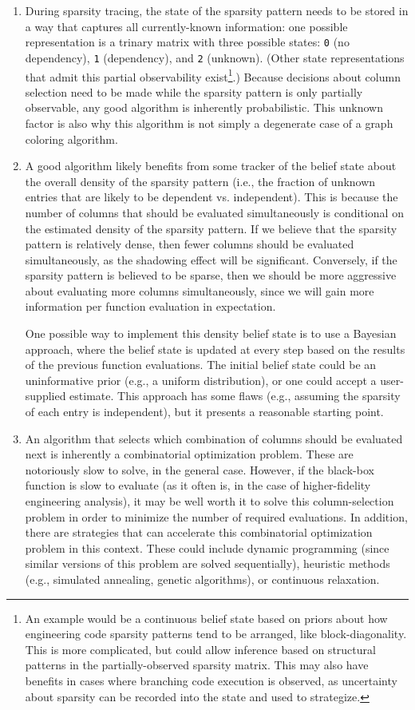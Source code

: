\documentclass{article}
\begin{document}
\begin{enumerate}
    \item During sparsity tracing, the state of the sparsity pattern needs to be stored in a way that captures all currently-known information: one possible representation is a trinary matrix with three possible states: \texttt{0} (no dependency), \texttt{1} (dependency), and \texttt{2} (unknown). (Other state representations that admit this partial observability exist\footnote{An example would be a continuous belief state based on priors about how engineering code sparsity patterns tend to be arranged, like block-diagonality. This is more complicated, but could allow inference based on structural patterns in the partially-observed sparsity matrix. This may also have benefits in cases where branching code execution is observed, as uncertainty about sparsity can be recorded into the state and used to strategize.}.) Because decisions about column selection need to be made while the sparsity pattern is only partially observable, any good algorithm is inherently probabilistic. This unknown factor is also why this algorithm is not simply a degenerate case of a graph coloring algorithm.
    \item A good algorithm likely benefits from some tracker of the belief state about the overall density of the sparsity pattern (i.e., the fraction of unknown entries that are likely to be dependent vs. independent). This is because the number of columns that should be evaluated simultaneously is conditional on the estimated density of the sparsity pattern. If we believe that the sparsity pattern is relatively dense, then fewer columns should be evaluated simultaneously, as the shadowing effect will be significant. Conversely, if the sparsity pattern is believed to be sparse, then we should be more aggressive about evaluating more columns simultaneously, since we will gain more information per function evaluation in expectation.

          One possible way to implement this density belief state is to use a Bayesian approach, where the belief state is updated at every step based on the results of the previous function evaluations. The initial belief state could be an uninformative prior (e.g., a uniform distribution), or one could accept a user-supplied estimate. This approach has some flaws (e.g., assuming the sparsity of each entry is independent), but it presents a reasonable starting point.

    \item An algorithm that selects which combination of columns should be evaluated next is inherently a combinatorial optimization problem. These are notoriously slow to solve, in the general case. However, if the black-box function is slow to evaluate (as it often is, in the case of higher-fidelity engineering analysis), it may be well worth it to solve this column-selection problem in order to minimize the number of required evaluations. In addition, there are strategies that can accelerate this combinatorial optimization problem in this context. These could include dynamic programming (since similar versions of this problem are solved sequentially), heuristic methods (e.g., simulated annealing, genetic algorithms), or continuous relaxation.


\end{enumerate}
\end{document}
